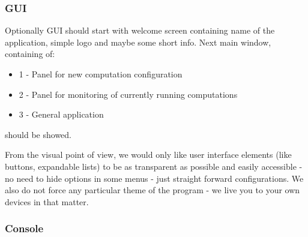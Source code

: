 \documentclass{article}
\begin{document}
\subsubsection{GUI}
Optionally GUI should start with welcome screen containing name of the application, simple logo and maybe some short info. Next main window, containing of:
\begin{itemize} 
\item 1 - Panel for new computation configuration
\item 2 - Panel for monitoring of currently running computations
\item 3 - General application 
\end{itemize} 
should be showed. 

From the visual point of view, we would only like user interface elements (like buttons, expandable lists) to be as transparent as possible and easily accessible - no need to hide options in some menus - just straight forward configurations. We also do not force any particular theme of the program - we live you to your own devices in that matter.

\subsubsection{Console}
\end{document}
